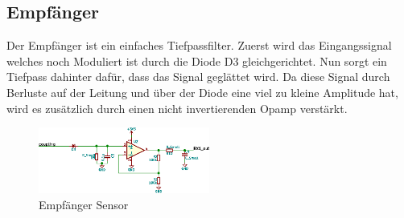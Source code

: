 
\subsection{Empf\"anger}
\label{subsec:hw:sensor:receiver}

Der Empfänger ist ein einfaches Tiefpassfilter.
Zuerst wird das Eingangssignal welches noch Moduliert ist durch die Diode D3 gleichgerichtet. Nun sorgt ein Tiefpass dahinter dafür, dass das Signal geglättet wird. Da diese Signal durch Berluste auf der Leitung und über der Diode eine viel zu kleine Amplitude hat, wird es zusätzlich durch einen nicht invertierenden Opamp verstärkt.

\begin{figure}[h!t]
    \centering
    \includegraphics[width=0.5\textwidth]{images/sensor-sch/sensor--sch--receiver.eps}
    \caption[Sensor: Schema Empf\"anger]{Empf\"anger Sensor}
\end{figure}

